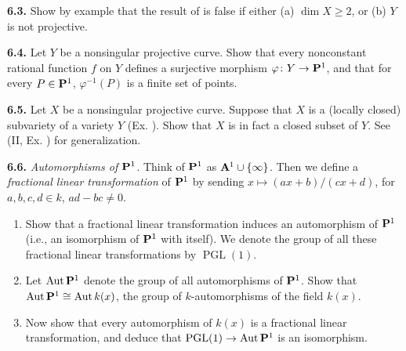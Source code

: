 {\smallskip
\noindent\hypertarget{ex-I-6.3}{}\textbf{6.3.} Show by example that the result of  is false if either (a) $\dim X\ge2$, or (b) $Y$ is not projective.

\smallskip
\noindent\hypertarget{ex-I-6.4}{}\textbf{6.4.} Let $Y$ be a nonsingular projective curve. Show that every nonconstant rational function $f$ on $Y$ defines a surjective morphism $\varphi\colon Y\to\mathbf{P}^1$, and that for every $P\in\mathbf{P}^1$, $\varphi^{-1}(P)$ is a finite set of points.

\smallskip
\noindent\hypertarget{ex-I-6.5}{}\textbf{6.5.} Let $X$ be a nonsingular projective curve. Suppose that $X$ is a (locally closed) subvariety of a variety $Y$ (Ex. ). Show that $X$ is in fact a closed subset of $Y$. See (II, Ex. ) for generalization.

\smallskip
\noindent\hypertarget{ex-I-6.6}{}\textbf{6.6.} \emph{Automorphisms of $\mathbf{P}^1$.} Think of $\mathbf{P}^1$ as $\AffSpace{1}\cup\{\infty\}$. Then we define a \emph{fractional linear transformation} of $\mathbf{P}^1$ by sending $x\mapsto(ax+b)/(cx+d)$, for $a,b,c,d\in k$, $ad-bc\ne0$.
\begin{enumerate}[label=(\alph*),leftmargin=2.4em,nosep]
\item Show that a fractional linear transformation induces an automorphism of $\mathbf{P}^1$ (i.e., an isomorphism of $\mathbf{P}^1$ with itself). We denote the group of all these fractional linear transformations by $\operatorname{PGL}(1)$.
\item Let $\operatorname{Aut}\mathbf{P}^1$ denote the group of all automorphisms of $\mathbf{P}^1$. Show that $\operatorname{Aut}\mathbf{P}^1\cong\operatorname{Aut}k(x)$, the group of $k$-automorphisms of the field $k(x)$.
\item Now show that every automorphism of $k(x)$ is a fractional linear transformation, and deduce that $\operatorname{PGL}(1)\to\operatorname{Aut}\mathbf{P}^1$ is an isomorphism.
\end{enumerate}}
